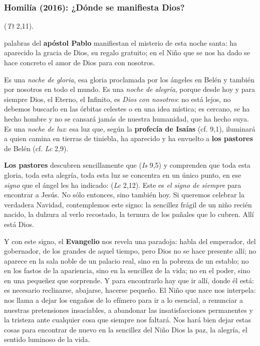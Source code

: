 \subsubsection{Homilía (2016): ¿Dónde se manifiesta Dios?}


\begin{body}
	 (\emph{Tt} 2,11).
	
	 palabras del \textbf{apóstol Pablo} manifiestan el misterio de esta noche santa: ha aparecido la gracia de Dios, su regalo gratuito; en el Niño que se nos ha dado se hace concreto el amor de Dios para con nosotros.
	
	Es una \emph{noche de gloria}, esa gloria proclamada por los ángeles en Belén y también por nosotros en todo el mundo. Es una \emph{noche de alegría}, porque desde hoy y para siempre Dios, el Eterno, el Infinito, es \emph{Dios con nosotros}: no está lejos, no debemos buscarlo en las órbitas celestes o en una idea mística; es cercano, se ha hecho hombre y no se cansará jamás de nuestra humanidad, que ha hecho suya. Es una \emph{noche de luz}: esa luz que, según la \textbf{profecía de Isaías} (cf. 9,1), iluminará a quien camina en tierras de tiniebla, ha aparecido y ha envuelto a \textbf{los pastores} de Belén (cf. \emph{Lc} 2,9).
	
	\textbf{Los pastores} descubren sencillamente que  (\emph{Is} 9,5) y comprenden que toda esta gloria, toda esta alegría, toda esta luz se concentra en un único punto, en ese \emph{signo} que el ángel les ha indicado:  (\emph{Lc} 2,12). Este es \emph{el signo de siempre} para encontrar a Jesús. No sólo entonces, sino también hoy. Si queremos celebrar la verdadera Navidad, contemplemos este signo: la sencillez frágil de un niño recién nacido, la dulzura al verlo recostado, la ternura de los pañales que lo cubren. Allí está Dios.
	
	Y con este signo, el \textbf{Evangelio} nos revela una paradoja: habla del emperador, del gobernador, de los grandes de aquel tiempo, pero Dios no se hace presente allí; no aparece en la sala noble de un palacio real, sino en la pobreza de un establo; no en los fastos de la apariencia, sino en la sencillez de la vida; no en el poder, sino en una pequeñez que sorprende. Y para encontrarlo hay que ir allí, donde él está: es necesario reclinarse, abajarse, hacerse pequeño. El Niño que nace nos interpela: nos llama a dejar los engaños de lo efímero para ir a lo esencial, a renunciar a nuestras pretensiones insaciables, a abandonar las insatisfacciones permanentes y la tristeza ante cualquier cosa que siempre nos faltará. Nos hará bien dejar estas cosas para encontrar de nuevo en la sencillez del Niño Dios la paz, la alegría, el sentido luminoso de la vida.
	

\end{body}
